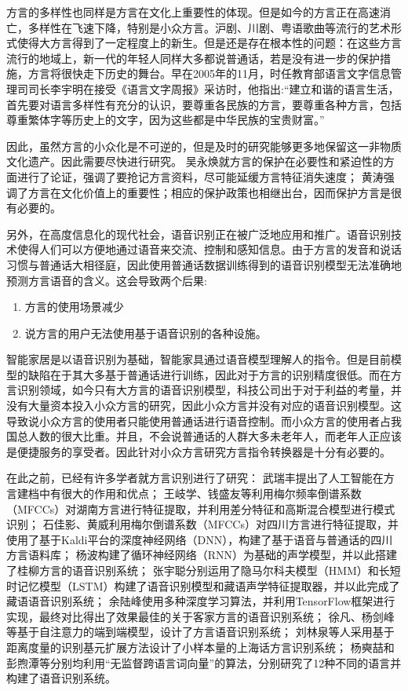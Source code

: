\documentclass[lang=cn,cite=super]{elegantpaper}
\begin{document}
方言的多样性也同样是方言在文化上重要性的体现。但是如今的方言正在高速消亡，多样性在飞速下降，特别是小众方言。沪剧、川剧、粤语歌曲等流行的艺术形式使得大方言得到了一定程度上的新生。但是还是存在根本性的问题：在这些方言流行的地域上，新一代的年轻人同样大多都说普通话，若是没有进一步的保护措施，方言将很快走下历史的舞台。早在2005年的11月，时任教育部语言文字信息管理司司长李宇明在接受《语言文字周报》采访时，他指出:“建立和谐的语言生活，首先要对语言多样性有充分的认识，要尊重各民族的方言，要尊重各种方言，包括尊重繁体字等历史上的文字，因为这些都是中华民族的宝贵财富。”

因此，虽然方言的小众化是不可逆的，但是及时的研究能够更多地保留这一非物质文化遗产。因此需要尽快进行研究。
吴永焕\cite{WuYonghuan}就方言的保护在必要性和紧迫性的方面进行了论证，强调了要抢记方言资料，尽可能延缓方言特征消失速度；
黄涛\cite{Huangtao}强调了方言在文化价值上的重要性；相应的保护政策也相继出台，因而保护方言是很有必要的。

另外，在高度信息化的现代社会，语音识别正在被广泛地应用和推广。语音识别技术使得人们可以方便地通过语音来交流、控制和感知信息。由于方言的发音和说话习惯与普通话大相径庭，因此使用普通话数据训练得到的语音识别模型无法准确地预测方言语音的含义。这会导致两个后果:
\begin{enumerate}
    \item 方言的使用场景减少
    \item 说方言的用户无法使用基于语音识别的各种设施。
\end{enumerate}

智能家居是以语音识别为基础，智能家具通过语音模型理解人的指令。但是目前模型的缺陷在于其大多基于普通话进行训练，因此对于方言的识别精度很低。而在方言识别领域，如今只有大方言的语音识别模型，科技公司出于对于利益的考量，并没有大量资本投入小众方言的研究，因此小众方言并没有对应的语音识别模型。这导致说小众方言的使用者只能使用普通话进行语音控制。而小众方言的使用者占我国总人数的很大比重。并且，不会说普通话的人群大多未老年人，而老年人正应该是便捷服务的享受者。因此针对小众方言研究方言指令转换器是十分有必要的。

在此之前，已经有许多学者就方言识别进行了研究：
武瑞丰\cite{WuRuiFeng}提出了人工智能在方言建档中有很大的作用和优点；
王岐学、钱盛友\cite{WangQiXue}等利用梅尔频率倒谱系数（MFCCs）对湖南方言进行特征提取，并利用差分特征和高斯混合模型进行模式识别；
石佳影、黄威\cite{ShiJiaYing2016}利用梅尔倒谱系数（MFCCs）对四川方言进行特征提取，并使用了基于Kaldi平台的深度神经网络（DNN），构建了基于语音与普通话的四川方言语料库；
杨波\cite{YangBo2019}构建了循环神经网络（RNN）为基础的声学模型，并以此搭建了桂柳方言的语音识别系统；
张宇聪\cite{ZhangYuCong2016}分别运用了隐马尔科夫模型（HMM）和长短时记忆模型（LSTM）构建了语音识别模型和藏语声学特征提取器，并以此完成了藏语语音识别系统；
余陆峰\cite{YuLuFeng2019}使用多种深度学习算法，并利用TensorFlow框架进行实现，最终对比得出了效果最佳的关于客家方言的语音识别系统；
徐凡、杨剑峰等\cite{XuFan2021}基于自注意力的端到端模型，设计了方言语音识别系统；
刘林泉等人\cite{LiuLinQuan2008}采用基于距离度量的识别基元扩展方法设计了小样本量的上海话方言识别系统；
杨奭喆\cite{YangShiZhe2020}和彭煦潭等\cite{peng2020}\cite{2021Cross}分别均利用“无监督跨语言词向量”的算法，分别研究了12种不同的语言并构建了语音识别系统。
\end{document}
